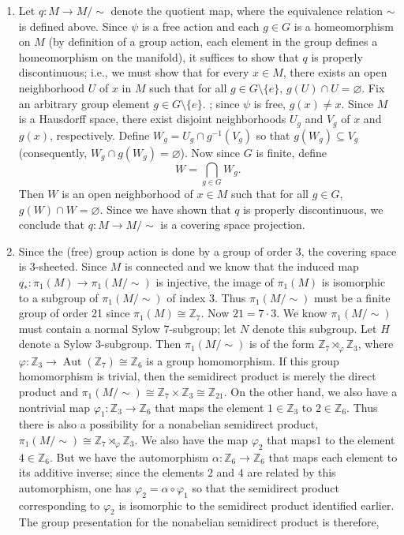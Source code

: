 \documentclass{article}
\begin{document}
	\begin{enumerate}[itemsep =-2pt,label = (\alph{*})]
		\item Let $q: M \to M/\sim$ denote the quotient map, where the equivalence relation $\sim$ is defined above. Since $\psi$ is a free action and each $g \in G$ is a homeomorphism on $M$ (by definition of a group action, each  element in the group defines a homeomorphism on the manifold), it suffices to show that $q$ is properly discontinuous; i.e., we must show that for every $x \in M$, there exists an open neighborhood $U$ of $x$ in $M$ such that for all $g \in G\setminus \{e\}$, $g(U) \cap U = \varnothing$. Fix an arbitrary group element $g \in G \setminus \{e\}$. ; since $\psi$ is free, $g(x) \neq x$. Since $M$ is a Hausdorff space, there exist disjoint neighborhoods $U_{g}$ and $V_{g}$ of $x$ and $g(x)$, respectively. Define $W_{g} = U_{g} \cap g^{-1}(V_{g})$ so that $g(W_{g}) \subseteq V_{g}$ (consequently, $W_{g} \cap g(W_{g}) = \varnothing$). Now since $G$ is finite, define 
		\begin{equation*}
			W = \bigcap_{g \in G}W_{g}. 
		\end{equation*}
		Then $W$ is an open neighborhood of $x \in M$ such that for all $g \in G$, $g(W) \cap W = \varnothing$. Since we have shown that $q$ is properly discontinuous, we conclude that $q: M \to M/\sim$ is a covering space projection. 
		\item Since the (free) group action is done by a group of order 3, the covering space is 3-sheeted. Since $M$ is connected and we know that the induced map $q_{\ast}: \pi_{1}(M) \to \pi_{1}(M/\sim)$ is injective, the image of $\pi_{1}(M)$ is isomorphic to a subgroup of $\pi_{1}(M/\sim)$ of index 3. Thus $\pi_{1}(M/\sim)$ must be a finite group of order 21 since $\pi_{1}(M) \cong \mathbb{Z}_{7}$. Now $21 = 7 \cdot 3$. We know $\pi_{1}(M/\sim)$ must contain a normal Sylow 7-subgroup; let $N$ denote this subgroup. Let $H$ denote a Sylow 3-subgroup. Then $\pi_{1}(M/\sim)$ is of the form $\mathbb{Z}_{7} \rtimes_{\varphi} \mathbb{Z}_{3}$, where $\varphi: \mathbb{Z}_{3} \to \operatorname{Aut}(\mathbb{Z}_{7}) \cong \mathbb{Z}_{6}$ is a group homomorphism. If this group homomorphism is trivial, then the semidirect product is merely the direct product and $\pi_{1}(M/\sim) \cong \mathbb{Z}_{7} \times \mathbb{Z}_{3} \cong \mathbb{Z}_{21}$. On the other hand, we also have a nontrivial map $\varphi_{1}: \mathbb{Z}_{3} \to \mathbb{Z}_{6}$ that maps the element $1 \in \mathbb{Z}_{3}$ to $2 \in \mathbb{Z}_{6}$. Thus there is also a possibility for a nonabelian semidirect product, $\pi_{1}(M/\sim) \cong \mathbb{Z}_{7} \rtimes_{\varphi} \mathbb{Z}_{3}$. We also have the map $\varphi_{2}$ that maps$1$ to the element $4 \in \mathbb{Z}_{6}$. But we have the automorphism $\alpha: \mathbb{Z}_{6} \to \mathbb{Z}_{6}$ that maps each element to its additive inverse; since the elements $2$ and $4$ are related by this automorphism, one has $\varphi_{2} = \alpha \circ \varphi_{1}$ so that the semidirect product corresponding to $\varphi_{2}$ is isomorphic to the semidirect product identified earlier. The group presentation for the nonabelian semidirect product is therefore, 

\end{enumerate}
\end{document}
